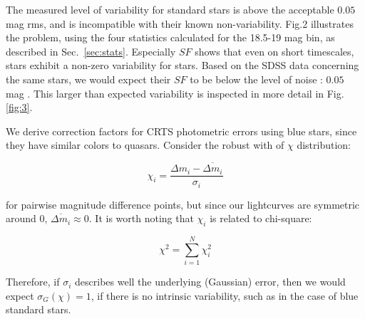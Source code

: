 \documentclass[fleqn,usenatbib]{mnras}  %
\begin{document}
The measured level of variability for standard stars is above the acceptable $0.05$ mag rms, and is incompatible with their known non-variability. Fig.2 illustrates the problem, using the four statistics calculated for the 18.5-19 mag bin, as described in Sec.~\ref{sec:stats}.  Especially $SF$ shows that even on short timescales, stars exhibit a non-zero variability for stars. Based on the SDSS data concerning the same stars, we would expect their $SF$ to be below the level of noise : $0.05$ mag \citep{ivezic2007}. This larger than expected variability is inspected in more detail in Fig.\ref{fig:3}. 


We derive correction factors for CRTS photometric errors using blue stars, since they  have similar colors to quasars. Consider the robust with of $\chi$ distribution:

\begin{equation}
\chi_{i} = \frac{\Delta m_{i} - \overline{\Delta m_{i}}}{\sigma_{i}}
\end{equation}

for pairwise magnitude difference points, but since our lightcurves are symmetric around 0, $\overline{\Delta m_{i}} \approx 0$.  It is worth noting that $\chi_{i}$ is related to chi-square: 

\begin{equation}
\chi^{2} = \sum_{i=1}^{N}{\chi_{i}^{2}}
\end{equation}

Therefore, if $\sigma_{i}$ describes well the underlying (Gaussian) error, then we would expect $\sigma_{G}(\chi) = 1$, if there is no intrinsic variability, such as in the case of blue standard stars. 
\end{document}
